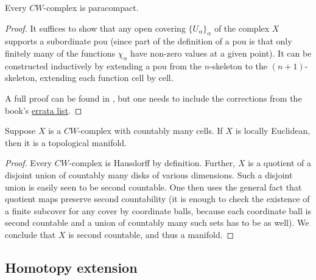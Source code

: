 \begin{thm}
    Every $CW$-complex is paracompact.
\end{thm}
\begin{proof}
    It suffices to show that any open covering $\{U_\alpha\}_\alpha$ of the complex $X$ supports a subordinate \gls{pou} (since part of the definition of a \gls{pou} is that only finitely many of the functions $\chi_\alpha$ have non-zero values at a given point). It can be constructed inductively by extending a \gls{pou} from the $n$-skeleton to the $(n+1)$-skeleton, extending each function cell by cell.
    
    A full proof can be found in \cite[Thm.~5.22]{LeeTop}, but one needs to include the corrections from the book's \href{https://sites.math.washington.edu//~lee/Books/ITM/errata.pdf}{errata list}. 
\end{proof}

\begin{prop}
    Suppose $X$ is a $CW$-complex with countably many cells. If $X$ is locally Euclidean, then it is a topological manifold.
\end{prop}
\begin{proof}
    Every $CW$-complex is Hausdorff by definition. Further, $X$ is a quotient of a disjoint union of countably many disks of various dimensions. Such a disjoint union is easily seen to be second countable. One then uses the general fact that quotient maps preserve second countability (it is enough to check the existence of a finite subcover for any cover by coordinate balls, because each coordinate ball is second countable and a union of countably many such sets has to be as well). We conclude that $X$ is second countable, and thus a manifold.
\end{proof}




\subsection{Homotopy extension}

